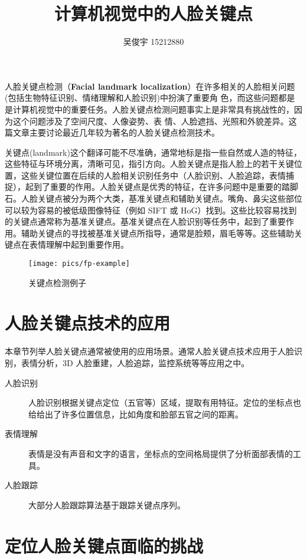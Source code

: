 \documentclass{ctexart}
\title{计算机视觉中的人脸关键点}
\author{吴俊宇 15212880}
\begin{document}
\maketitle

人脸关键点检测（\textbf{Facial landmark localization}）在许多相关的人脸相关问题(包括生物特征识别、情绪理解和人脸识别)中扮演了重要角
色，而这些问题都是是计算机视觉中的重要任务。人脸关键点检测问题事实上是非常具有挑战性的，因为这个问题涉及了空间尺度、人像姿势、表
情、人脸遮挡、光照和外貌差异。这篇文章主要讨论最近几年较为著名的人脸关键点检测技术。

关键点(landmark)这个翻译可能不尽准确，通常地标是指一些自然或人造的特征，这些特征与环境分离，清晰可见，指引方向。人脸关键点是指人脸上的若干关键位置，这些关键位置在后续的人脸相关识别任务中（人脸识别、人脸追踪，表情捕捉），起到了重要的作用。人脸关键点是优秀的特征，在许多问题中是重要的踏脚石。人脸关键点被分为两个大类，基准关键点和辅助关键点。嘴角、鼻尖这些部位可以较为容易的被低级图像特征（例如 SIFT 或 HoG）找到。这些比较容易找到的关键点通常称为基准关键点。基准关键点在人脸识别等任务中，起到了重要作用。辅助关键点的寻找被基准关键点所指导，通常是脸颊，眉毛等等。这些辅助关键点在表情理解中起到重要作用。

\begin{figure}
\centering
\texttt{[image: pics/fp-example]}
\caption[]{关键点检测例子}
\label{fig:fp-example}
\end{figure}

\section{人脸关键点技术的应用}

本章节列举人脸关键点通常被使用的应用场景。通常人脸关键点技术应用于人脸识别，表情分析，3D 人脸重建，人脸追踪，监控系统等等应用之中\cite{survey}。

\begin{description}
	\item[人脸识别] 人脸识别根据关键点定位（五官等）区域，提取有用特征。定位的坐标点也给给出了许多位置信息，比如角度和脸部五官之间的距离。
	\item[表情理解] 表情是没有声音和文字的语言，坐标点的空间格局提供了分析面部表情的工具。
	\item[人脸跟踪] 大部分人脸跟踪算法基于跟踪关键点序列。
\end{description}

\section{定位人脸关键点面临的挑战}
\end{document}
